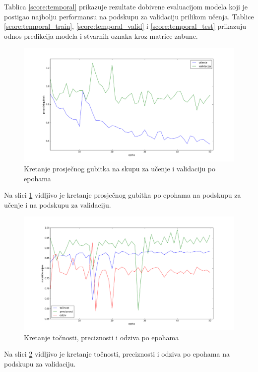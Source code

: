 \documentclass[times, utf8, diplomski, numeric]{fer}
\begin{document}
\noindent Tablica \ref{score:temporal} prikazuje rezultate dobivene evaluacijom modela koji je postigao najbolju performansu na podskupu za validaciju prilikom učenja.
Tablice \ref{score:temporal_train}, \ref{score:temporal_valid} i \ref{score:temporal_test} prikazuju odnos predikcija modela i stvarnih oznaka kroz matrice zabune.

\begin{figure}[H]
\centering
\includegraphics[scale=0.35]{images/temporal_loss.png}
\caption{Kretanje prosječnog gubitka na skupu za učenje i validaciju po epohama}
\label{img:temporal_loss}
\end{figure}
\noindent Na slici \ref{img:temporal_loss} vidljivo je kretanje prosječnog gubitka po epohama na podskupu za učenje i na podskupu za validaciju.

\begin{figure}[H]
\centering
\includegraphics[scale=0.35]{images/temporal_ac_ap.png}
\caption{Kretanje točnosti, preciznosti i odziva po epohama}
\label{img:temporal_ac_ap}
\end{figure}
\noindent Na slici \ref{img:temporal_ac_ap} vidljivo je kretanje točnosti, preciznosti i odziva po epohama na podskupu za validaciju.
\end{document}
